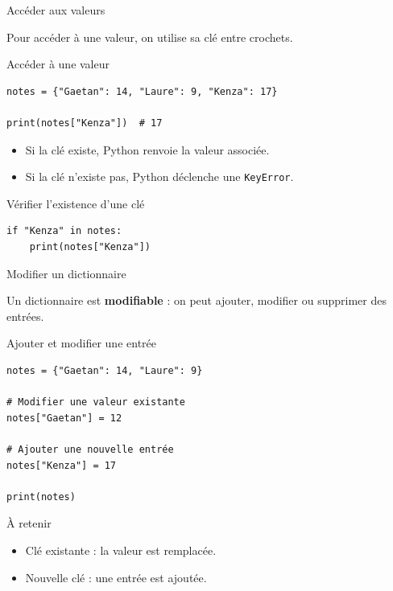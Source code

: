 \documentclass[10pt]{beamer}
\begin{document}
\begin{frame}[fragile]{Accéder aux valeurs}

Pour accéder à une valeur, on utilise sa clé entre crochets.

\begin{exampleblock}{Accéder à une valeur}
\small
\begin{lstlisting}
notes = {"Gaetan": 14, "Laure": 9, "Kenza": 17}

print(notes["Kenza"])  # 17
\end{lstlisting}
\end{exampleblock}

\begin{itemize}
    \item Si la clé existe, Python renvoie la valeur associée.
    \item Si la clé n'existe pas, Python déclenche une
    \texttt{KeyError}.
\end{itemize}

\begin{exampleblock}{Vérifier l'existence d'une clé}
\small
\begin{lstlisting}
if "Kenza" in notes:
    print(notes["Kenza"])
\end{lstlisting}
\end{exampleblock}

\end{frame}
\begin{frame}[fragile]{Modifier un dictionnaire}

Un dictionnaire est \textbf{modifiable} : on peut ajouter,
modifier ou supprimer des entrées.

\begin{exampleblock}{Ajouter et modifier une entrée}
\small
\begin{lstlisting}
notes = {"Gaetan": 14, "Laure": 9}

# Modifier une valeur existante
notes["Gaetan"] = 12

# Ajouter une nouvelle entrée
notes["Kenza"] = 17

print(notes)
\end{lstlisting}
\end{exampleblock}

\begin{block}{À retenir}
\small
\begin{itemize}
    \item Clé existante : la valeur est remplacée.
    \item Nouvelle clé : une entrée est ajoutée.
\end{itemize}
\end{block}

\end{frame}
\end{document}
